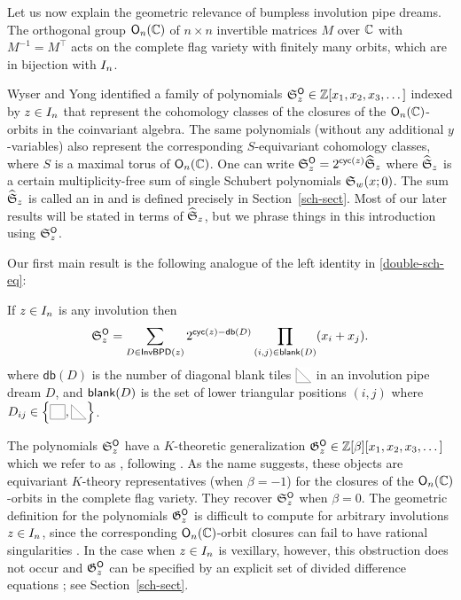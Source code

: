 \documentclass[10pt]{article}
\begin{document}
Let us now explain  the geometric relevance of bumpless involution pipe dreams.
The orthogonal group $\mathsf{O}_n(\mathbb{C})$
of $n\times n$ invertible matrices $M$ over $\mathbb{C}$ with $M^{-1} = M^\top$
acts on the complete flag variety with finitely many orbits,
which are in bijection with $I_n$.

Wyser and Yong \cite{WyserYong2017} identified a family of polynomials
$\mathfrak S^{\mathsf{O}}_z \in \mathbb{Z}[x_1,x_2,x_3,\dots]$ indexed by $z \in I_n$ that represent 
 the   cohomology classes of the closures of the $\mathsf{O}_n(\mathbb{C})$-orbits in 
  the coinvariant algebra.
The same polynomials (without any additional $y$-variables) also represent the corresponding
$S$-equivariant cohomology classes, where $S$ is a maximal torus of $\mathsf{O}_n(\mathbb{C})$. 
One can write
$ \mathfrak S^{\mathsf{O}}_z = 2^{\textsf{cyc}(z)} \widehat{\mathfrak S}_z$
where $\widehat{\mathfrak S}_z$ is a certain multiplicity-free sum of single Schubert polynomials $\mathfrak S_w(x;0)$.
The sum $\widehat{\mathfrak S}_z$ is called an  in \cite{HMP1}
and is defined precisely in Section~\ref{sch-sect}.
Most of our later results will be stated in terms of $\widehat{\mathfrak S}_z$, but we phrase things in this introduction  
using $\mathfrak S^{\mathsf{O}}_z$.







Our first main result is the following analogue of the left identity in
\eqref{double-sch-eq}:

\begin{mainthm}
\label{thmA}
If $z \in I_n$ is any involution then \[
  \mathfrak S^{\mathsf{O}}_z = \sum_{D \in \mathsf{InvBPD}(z)} 2^{\textsf{cyc}(z) - \mathsf{db}(D)} \prod_{(i,j) \in \mathsf{blank}(D)} (x_i +x_j).
\]
where $\mathsf{db}(D)$ is the number of diagonal blank tiles $\BDIAG$ in an involution pipe dream $D$, and $\mathsf{blank}(D)$ is the set of lower triangular positions $(i,j)$ where
$D_{ij} \in \left\{\BTILE,\BDIAG\right\}$.
\end{mainthm}


The polynomials $\mathfrak S^{\mathsf{O}}_z$ have a $K$-theoretic generalization $\mathfrak{G}^{\mathsf{O}}_z \in \mathbb{Z}[\beta][x_1,x_2,x_3,\dots]$ which we refer to as , following \cite{MarPawK}. 
As the name suggests, these objects are equivariant $K$-theory representatives (when $\beta=-1$) for the closures of the $\mathsf{O}_n(\mathbb{C})$-orbits in the complete flag variety. They recover $\mathfrak S^{\mathsf{O}}_z$ when $\beta=0$.
The geometric definition for the polynomials $\mathfrak{G}^{\mathsf{O}}_z$ is difficult to compute for arbitrary involutions $z \in I_n$, 
since the corresponding $\mathsf{O}_n(\mathbb{C})$-orbit closures can fail to have rational singularities \cite{WyserYong2017}.
In the case when $z \in I_n$ is vexillary, however,
 this obstruction does not occur and $\mathfrak{G}^{\mathsf{O}}_z$ can be specified by 
an explicit set of divided difference equations \cite{MarPawK}; see Section~\ref{sch-sect}.
\end{document}

